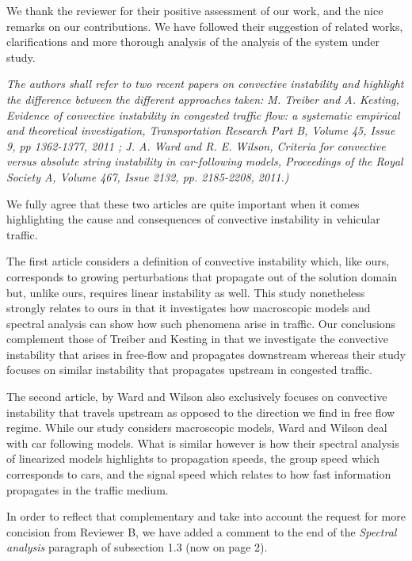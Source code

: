 \documentclass{article}
\begin{document}
We thank the reviewer for their positive assessment of our work, and the nice remarks on our contributions. We have followed their suggestion of related works, clarifications and more thorough analysis of the analysis of the system under study.\\

\bigskip{}

\emph{
The authors shall refer to two recent papers on convective instability and highlight the difference between the different approaches taken: M. Treiber and A. Kesting, Evidence of convective instability in congested traffic flow: a systematic empirical and theoretical investigation, Transportation Research Part B, Volume 45, Issue 9, pp 1362-1377, 2011 ; J. A. Ward and R. E. Wilson, Criteria for convective versus absolute string instability in car-following models, Proceedings of the Royal Society A, Volume 467, Issue 2132, pp. 2185-2208, 2011.)
}

We fully agree that these two articles are quite important when it comes highlighting the cause and consequences of convective instability in vehicular traffic.

The first article considers a definition of convective instability which, like ours, corresponds to growing perturbations that propagate out of the solution domain but, unlike ours, requires linear instability as well. This study nonetheless strongly relates to ours in that it investigates how macroscopic models and spectral analysis can show how such phenomena arise in traffic. Our conclusions complement those of Treiber and Kesting in that we investigate the convective instability that arises in free-flow and propagates downstream whereas their study focuses on similar instability that propagates upstream in congested traffic.

The second article, by Ward and Wilson also exclusively focuses on convective instability that travels upstream as opposed to the direction we find in free flow regime. While our study considers macroscopic models, Ward and Wilson deal with car following models. What is similar however is how their spectral analysis of linearized models highlights to propagation speeds, the group speed which corresponds to cars, and the signal speed which relates to how fast information propagates in the traffic medium.

In order to reflect that complementary and take into account the request for more concision from Reviewer B, we have added a comment to the end of the \textit{Spectral analysis} paragraph of subsection 1.3 (now on page 2).
\end{document}
